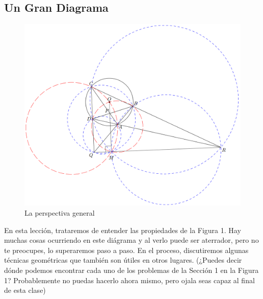 \documentclass[11pt, a4paper]{article}
\begin{document}
\begin{enumerate}
\section{Un Gran Diagrama}
\begin{figure}[h]
	\includegraphics[scale=0.5]{fig1}
	\centering
	\caption{La perspectiva general}
\end{figure}
En esta lecci\'on, trataremos de entender las propiedades de la Figura 1. Hay muchas cosas ocurriendo en este di\'agrama y al verlo puede ser aterrador, pero no te preocupes, lo superaremos paso a paso. En el proceso, discutiremos algunas t\'ecnicas geom\'etricas que tambi\'en son \'utiles en otros lugares.
(¿Puedes decir d\'onde podemos encontrar cada uno de los problemas de la Secci\'on 1 en la Figura 1? Probablemente no puedas hacerlo ahora mismo, pero ojala seas capaz al final de esta clase)

\end{enumerate}
\end{document}
